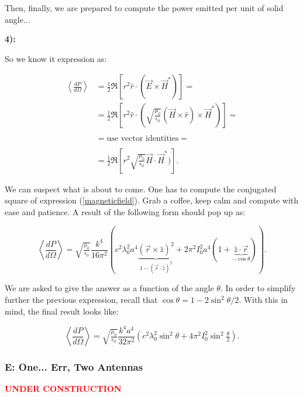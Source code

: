 Then, finally, we are prepared to compute the power emitted per unit of solid angle...

\textbf{4):}

So we know it expression as:

\begin{equation}
	\begin{split}
		\left\langle \frac{dP}{d\Omega}\right\rangle &= \frac{1}{2}\Re\left[r^{2} \hat{r}\cdot(\vec{E}\times \vec{H}^{*})\right] =\\
		&= \frac{1}{2}\Re\left[r^{2} \hat{r}\cdot\left(\sqrt{\tfrac{\mu_{0}}{\epsilon_{0}}}\left(\vec{H}\times \hat{r}\right)\times \vec{H}^{*}\right)\right]=\\
		&\\
		&= \text{use vector identities}=\\
		&\\
		&= \frac{1}{2}\Re\left[r^{2} \sqrt{\tfrac{\mu_{0}}{\epsilon_{0}}} \vec{H}\cdot \vec{H}^{*})\right].
	\end{split}
\end{equation}

We can suspect what is about to come. One has to compute the conjugated square of expression (\ref{magneticfield}). Grab a coffee, keep calm and compute with ease and patience. A result of the following form should pop up as:

\begin{equation}
	\left\langle \frac{dP}{d\Omega}\right\rangle = \sqrt{\tfrac{\mu_{0}}{\epsilon_{0}}} \frac{k^{4}}{16\pi^{2}} \left(c^{2}\lambda_{0}^{2}a^{4} \underbrace{(\vec{r}\times \hat{z})^{2}}_{1-(\vec{r}\cdot\hat{z})^{2}} + 2 \pi^{2} I_{0}^{2}a^{4}(1 + \underbrace{\hat{z}\cdot \vec{r}}_{-\cos\theta})\right).
\end{equation}

We are asked to give the answer as a function of the angle $\theta$. In order to simplify further the previous expression, recall that $\cos\theta = 1- 2\sin^{2}\theta/2$. With this in mind, the final result looks like:

\begin{equation}
	\left\langle \frac{dP}{d\Omega}\right\rangle =	\sqrt{\tfrac{\mu_{0}}{\epsilon_{0}}} \frac{k^{4}a^{4}}{32\pi^{2}} \left(c^{2}\lambda_{0}^{2} \sin^{2}\theta + 4 \pi^{2} I_{0}^{2}\sin^{2}\tfrac{\theta}{2}\right).
\end{equation}


\subsubsection{E: One... Err, Two Antennas}\label{E: Onubse... Err, Two Antennas}
\textbf{\textcolor{red}{UNDER CONSTRUCTION}}

